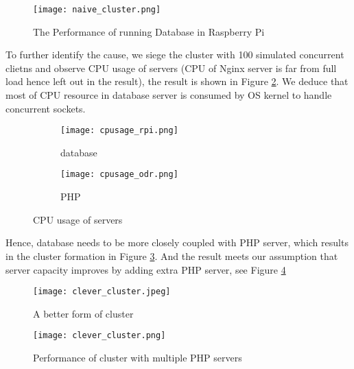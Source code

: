\begin{figure}[htbp]
\centering
\texttt{[image: naive\_cluster.png]}
\caption{The Performance of running Database in Raspberry Pi}
\label{naive_cluster}
\end{figure}

To further identify the cause, we siege the cluster with 100 simulated concurrent clietns and observe CPU usage of servers (CPU of Nginx server is far from full load hence left out in the result), the result is shown in Figure \ref{cpu_usage}. We deduce that most of CPU resource in database server is consumed by OS kernel to handle concurrent sockets.
\begin{figure}[htbp]
\centering
\begin{subfigure}{0.45\textwidth}
\centering
\texttt{[image: cpusage\_rpi.png]}
\caption{database}
\end{subfigure}
\begin{subfigure}{0.45\textwidth}
\centering
\texttt{[image: cpusage\_odr.png]}
\caption{PHP}
\end{subfigure}
\caption{CPU usage of servers}
\label{cpu_usage}
\end{figure}

Hence, database needs to be more closely coupled with PHP server, which results in the cluster formation in Figure \ref{good_cluster}. And the result meets our assumption that server capacity improves by adding extra PHP server, see Figure \ref{good_cluster_perf}

\begin{figure}[htbp]
\centering
\texttt{[image: clever\_cluster.jpeg]}
\caption{A better form of cluster}
\label{good_cluster}
\end{figure}
\begin{figure}[htbp]
\centering
\texttt{[image: clever\_cluster.png]}
\caption{Performance of cluster with multiple PHP servers}
\label{good_cluster_perf}
\end{figure}



